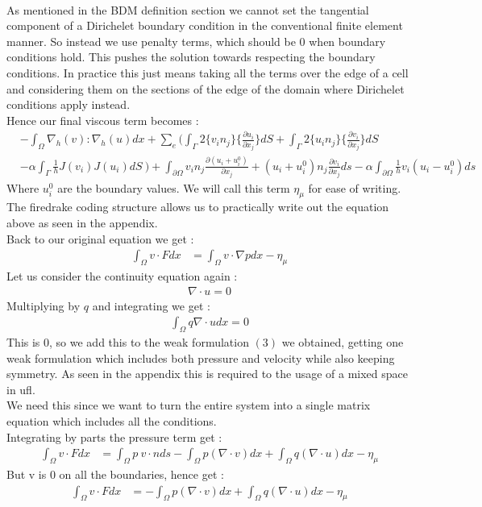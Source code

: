 \documentclass[11pt,twoside,a4paper]{article}
\begin{document}
\\
As mentioned in the BDM definition section we cannot set the tangential component of a Dirichelet boundary condition in the conventional finite element manner.  So instead we use penalty terms, which should be $0$ when boundary conditions hold. This pushes the solution towards respecting the boundary conditions. In practice this just means taking all the terms over the edge of a cell and considering them on the sections of the edge of the domain where Dirichelet conditions apply instead.\\
 Hence our final viscous term becomes :\\
\begin{align*}
&-  \int_\Omega \nabla_h(v) : \nabla_h(u) dx + \sum_e ( \int_\Gamma 2 \{ v_i n_j \} \{ \frac{\partial u_i}{\partial x_j}\} dS + \int_\Gamma 2 \{ u_i n_j \} \{ \frac{\partial v_i}{\partial x_j}\} dS \\
&- \alpha \int_\Gamma \frac{1}{h}  J(v_i) J(u_i) dS \ ) + \int_{\partial  \Omega} v_i n_j \frac{\partial(u_i + u^0_i)}{\partial x_j} + (u_i + u^0_i) n_j\frac{\partial v_i}{\partial x_j} ds - \alpha \int_{\partial \Omega} \frac{1}{h} v_i(u_i-u^0_i)ds
\end{align*}
Where $u^0_i$ are the boundary values.
We will call this term $\eta_\mu$ for ease of writing. The firedrake coding structure allows us to practically write out the equation above as seen in the appendix.\\
Back to our original equation we get :
\begin{align}
\int_\Omega v \cdot F dx &= \int_\Omega v \cdot \nabla p dx - \eta_\mu
\end{align}
Let us consider the continuity equation again :
\begin{align*}
\nabla \cdot u = 0
\end{align*}
Multiplying by $q$ and integrating we get :
\begin{align*}
\int_\Omega q \nabla \cdot u dx = 0
\end{align*}
This is $0$, so we add this to the weak formulation $(3)$ we obtained, getting one weak formulation which includes both pressure and velocity while also keeping symmetry. As seen in the appendix this is required to the usage of a mixed space in ufl.\\
We need this since we want to turn the entire system into a single matrix equation which includes all the conditions.\\
Integrating by parts the pressure term get :
\begin{align}
\int_\Omega v \cdot F dx &= \int_\Omega p \ v \cdot n ds - \int_\Omega  p ( \nabla \cdot v) dx + \int_\Omega q (\nabla \cdot u) dx  - \eta_\mu
\end{align}
But v is $0$ on all the boundaries, hence get :
\begin{align}
\int_\Omega v \cdot F dx &= - \int_\Omega  p ( \nabla \cdot v) dx + \int_\Omega q (\nabla \cdot u) dx  - \eta_\mu
\end{align}
\end{document}
